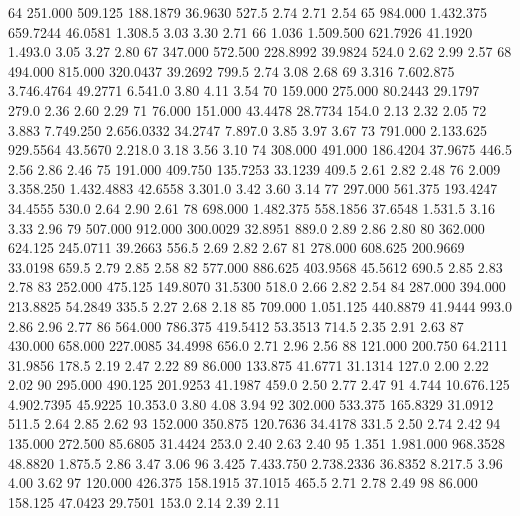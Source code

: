 \documentclass[12pt]{article}
\begin{document}
\begin{Schunk}
\begin{Soutput}
64  251.000    509.125   188.1879 36.9630    527.5    2.74    2.71    2.54
65  984.000  1.432.375   659.7244 46.0581  1.308.5    3.03    3.30    2.71
66    1.036  1.509.500   621.7926 41.1920  1.493.0    3.05    3.27    2.80
67  347.000    572.500   228.8992 39.9824    524.0    2.62    2.99    2.57
68  494.000    815.000   320.0437 39.2692    799.5    2.74    3.08    2.68
69    3.316  7.602.875 3.746.4764 49.2771  6.541.0    3.80    4.11    3.54
70  159.000    275.000    80.2443 29.1797    279.0    2.36    2.60    2.29
71   76.000    151.000    43.4478 28.7734    154.0    2.13    2.32    2.05
72    3.883  7.749.250 2.656.0332 34.2747  7.897.0    3.85    3.97    3.67
73  791.000  2.133.625   929.5564 43.5670  2.218.0    3.18    3.56    3.10
74  308.000    491.000   186.4204 37.9675    446.5    2.56    2.86    2.46
75  191.000    409.750   135.7253 33.1239    409.5    2.61    2.82    2.48
76    2.009  3.358.250 1.432.4883 42.6558  3.301.0    3.42    3.60    3.14
77  297.000    561.375   193.4247 34.4555    530.0    2.64    2.90    2.61
78  698.000  1.482.375   558.1856 37.6548  1.531.5    3.16    3.33    2.96
79  507.000    912.000   300.0029 32.8951    889.0    2.89    2.86    2.80
80  362.000    624.125   245.0711 39.2663    556.5    2.69    2.82    2.67
81  278.000    608.625   200.9669 33.0198    659.5    2.79    2.85    2.58
82  577.000    886.625   403.9568 45.5612    690.5    2.85    2.83    2.78
83  252.000    475.125   149.8070 31.5300    518.0    2.66    2.82    2.54
84  287.000    394.000   213.8825 54.2849    335.5    2.27    2.68    2.18
85  709.000  1.051.125   440.8879 41.9444    993.0    2.86    2.96    2.77
86  564.000    786.375   419.5412 53.3513    714.5    2.35    2.91    2.63
87  430.000    658.000   227.0085 34.4998    656.0    2.71    2.96    2.56
88  121.000    200.750    64.2111 31.9856    178.5    2.19    2.47    2.22
89   86.000    133.875    41.6771 31.1314    127.0    2.00    2.22    2.02
90  295.000    490.125   201.9253 41.1987    459.0    2.50    2.77    2.47
91    4.744 10.676.125 4.902.7395 45.9225 10.353.0    3.80    4.08    3.94
92  302.000    533.375   165.8329 31.0912    511.5    2.64    2.85    2.62
93  152.000    350.875   120.7636 34.4178    331.5    2.50    2.74    2.42
94  135.000    272.500    85.6805 31.4424    253.0    2.40    2.63    2.40
95    1.351  1.981.000   968.3528 48.8820  1.875.5    2.86    3.47    3.06
96    3.425  7.433.750 2.738.2336 36.8352  8.217.5    3.96    4.00    3.62
97  120.000    426.375   158.1915 37.1015    465.5    2.71    2.78    2.49
98   86.000    158.125    47.0423 29.7501    153.0    2.14    2.39    2.11

\end{Soutput}
\end{Schunk}
\end{document}
